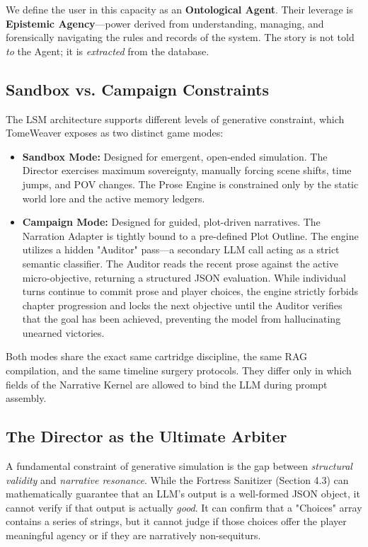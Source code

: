 \documentclass[12pt, a4paper]{article}
\begin{document}
We define the user in this capacity as an \textbf{Ontological Agent}. Their leverage is \textbf{Epistemic Agency}---power derived from understanding, managing, and forensically navigating the rules and records of the system. The story is not told \textit{to} the Agent; it is \textit{extracted} from the database. 

\subsection{Sandbox vs. Campaign Constraints}

The LSM architecture supports different levels of generative constraint, which TomeWeaver exposes as two distinct game modes:

\begin{itemize}
    \item \textbf{Sandbox Mode:} Designed for emergent, open-ended simulation. The Director exercises maximum sovereignty, manually forcing scene shifts, time jumps, and POV changes. The Prose Engine is constrained only by the static world lore and the active memory ledgers.
    \item \textbf{Campaign Mode:} Designed for guided, plot-driven narratives. The Narration Adapter is tightly bound to a pre-defined Plot Outline. The engine utilizes a hidden "Auditor" pass---a secondary LLM call acting as a strict semantic classifier. The Auditor reads the recent prose against the active micro-objective, returning a structured JSON evaluation. While individual turns continue to commit prose and player choices, the engine strictly forbids chapter progression and locks the next objective until the Auditor verifies that the goal has been achieved, preventing the model from hallucinating unearned victories.
\end{itemize}

Both modes share the exact same cartridge discipline, the same RAG compilation, and the same timeline surgery protocols. They differ only in which fields of the Narrative Kernel are allowed to bind the LLM during prompt assembly.

\subsection{The Director as the Ultimate Arbiter}

A fundamental constraint of generative simulation is the gap between \textit{structural validity} and \textit{narrative resonance}. While the Fortress Sanitizer (Section 4.3) can mathematically guarantee that an LLM’s output is a well-formed JSON object, it cannot verify if that output is actually \textit{good}. It can confirm that a "Choices" array contains a series of strings, but it cannot judge if those choices offer the player meaningful agency or if they are narratively non-sequiturs.
\end{document}
